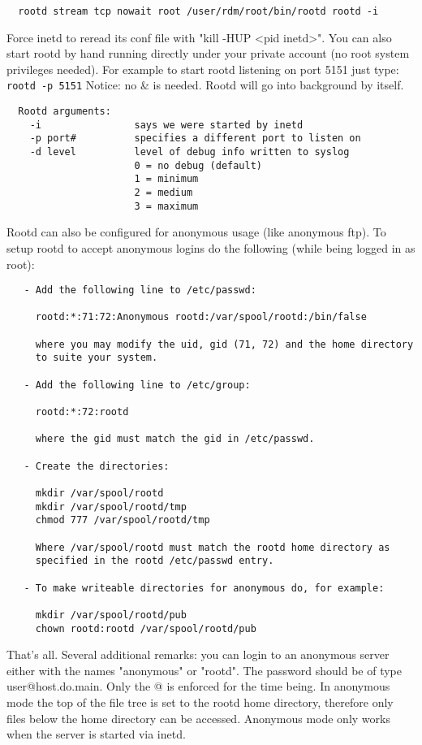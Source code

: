 \documentclass[11pt]{book}
\begin{document}
\begin{verbatim}
  rootd stream tcp nowait root /user/rdm/root/bin/rootd rootd -i
\end{verbatim}
Force inetd to reread its conf file with "kill -HUP <pid inetd>".
You can also start rootd by hand running directly under your private
account (no root system privileges needed). For example to start
rootd listening on port 5151 just type:   \verb+rootd -p 5151+
Notice: no \& is needed. Rootd will go into background by itself.

\begin{verbatim}
  Rootd arguments:
    -i                says we were started by inetd
    -p port#          specifies a different port to listen on
    -d level          level of debug info written to syslog
                      0 = no debug (default)
                      1 = minimum
                      2 = medium
                      3 = maximum
\end{verbatim}
Rootd can also be configured for anonymous usage (like anonymous ftp).
To setup rootd to accept anonymous logins do the following (while being
logged in as root):

\begin{verbatim}
   - Add the following line to /etc/passwd:

     rootd:*:71:72:Anonymous rootd:/var/spool/rootd:/bin/false

     where you may modify the uid, gid (71, 72) and the home directory
     to suite your system.

   - Add the following line to /etc/group:

     rootd:*:72:rootd

     where the gid must match the gid in /etc/passwd.

   - Create the directories:

     mkdir /var/spool/rootd
     mkdir /var/spool/rootd/tmp
     chmod 777 /var/spool/rootd/tmp

     Where /var/spool/rootd must match the rootd home directory as
     specified in the rootd /etc/passwd entry.

   - To make writeable directories for anonymous do, for example:

     mkdir /var/spool/rootd/pub
     chown rootd:rootd /var/spool/rootd/pub
\end{verbatim}
That's all.  Several additional remarks:  you can login to an anonymous
server either with the names "anonymous" or "rootd".  The password should
be of type user@host.do.main. Only the @ is enforced for the time
being.  In anonymous mode the top of the file tree is set to the rootd
home directory, therefore only files below the home directory can be
accessed.  Anonymous mode only works when the server is started via
inetd.
\end{document}

